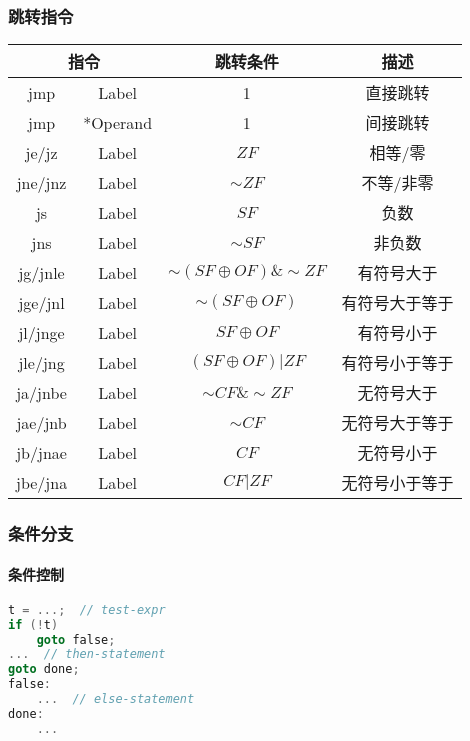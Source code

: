 \subsubsection{跳转指令}
\begin{table}[H]
    \centering
    \begin{tabular}{|c c|c|c|}
        \hline
        \multicolumn{2}{|c|}{\textbf{指令}} & \textbf{跳转条件} & \textbf{描述} \\
        \hline
        jmp & Label & 1 & 直接跳转 \\
        jmp & *Operand & 1 & 间接跳转 \\
        \hline
        je/jz & Label & $ZF$ & 相等/零 \\
        jne/jnz & Label & $\sim ZF$ & 不等/非零 \\
        \hline
        js & Label & $SF$ & 负数 \\
        jns & Label & $\sim SF$ & 非负数 \\
        \hline
        jg/jnle & Label & $\sim (SF \oplus OF) \& \sim ZF$ & 有符号大于 \\
        jge/jnl & Label & $\sim (SF \oplus OF)$ & 有符号大于等于 \\
        jl/jnge & Label & $SF \oplus OF$ & 有符号小于 \\
        jle/jng & Label & $(SF \oplus OF) | ZF$ & 有符号小于等于 \\
        \hline
        ja/jnbe & Label & $\sim CF \& \sim ZF$ & 无符号大于 \\
        jae/jnb & Label & $\sim CF$ & 无符号大于等于 \\
        jb/jnae & Label & $CF$ & 无符号小于 \\
        jbe/jna & Label & $CF | ZF$ & 无符号小于等于 \\
        \hline
    \end{tabular}
\end{table}

\subsubsection{条件分支}
\paragraph{条件控制}
\begin{lstlisting}[language=C]
t = ...;  // test-expr
if (!t)
    goto false;
...  // then-statement
goto done;
false:
    ...  // else-statement
done:
    ...
\end{lstlisting}
